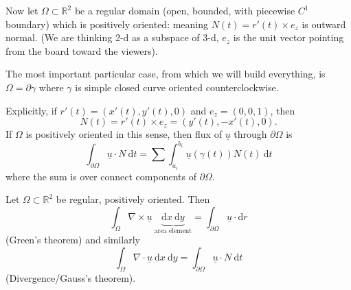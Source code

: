 \documentclass[a4paper]{article}
\theoremstyle{definition}
\begin{document}
Now let $\Omega\subset \mathbb R^2$ be a regular domain (open, bounded, with piecewise $C^1$ boundary) which is positively oriented: meaning $N(t) = r'(t) \times e_z$ is outward normal. (We are thinking 2-d as a subspace of 3-d, $e_z$ is the unit vector pointing from the board toward the viewers).

The most important particular case, from which we will build everything, is $\Omega = \partial \gamma$ where $\gamma$ is simple closed curve oriented counterclockwise.

Explicitly, if $r'(t) = (x'(t),y'(t),0)$ and $e_z = (0,0,1)$, then
\[
N(t) = r'(t) \times e_z = (y'(t),-x'(t),0).
\tag{$\ast$}
\]
If $\Omega$ is positively oriented in this sense, then flux of $\underline u$ through $\partial \Omega$ is
\[
\int_{\partial \Omega} \underline u \cdot N \ \mathrm d t = \sum \int_{a_i}^{b_i} \underline u (\gamma(t)) N(t) \ \mathrm d t
\]
where the sum is over connect components of $\partial \Omega$.

Let $\Omega \subset \mathbb R^2$ be regular, positively oriented. Then
\[
\int_\Omega \nabla \times \underline u \ \underbrace{\mathrm d x \ \mathrm d y}_{\text{area element}} = \int_{\partial \Omega} \underline u \cdot \mathrm d  r
\]
(Green's theorem) and similarly
\[
\int_\Omega \nabla \cdot \underline u \ \mathrm d x \ \mathrm d y = \int_{\partial \Omega} \underline u \cdot N \ \mathrm d t
\]
(Divergence/Gauss's theorem).
\end{document}
